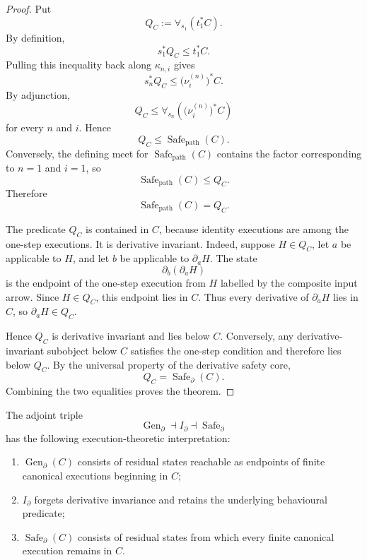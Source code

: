 \begin{proof}
Put
\[
    Q_C
    :=
    \forall_{s_1}(t_1^\ast C).
\]
By definition,
\[
    s_1^\ast Q_C
    \leq
    t_1^\ast C.
\]
Pulling this inequality back along \(\kappa_{n,i}\) gives
\[
    s_n^\ast Q_C
    \leq
    \bigl(\nu_i^{(n)}\bigr)^\ast C.
\]
By adjunction,
\[
    Q_C
    \leq
    \forall_{s_n}
    \left(
        \bigl(\nu_i^{(n)}\bigr)^\ast C
    \right)
\]
for every \(n\) and \(i\). Hence
\[
    Q_C
    \leq
    \operatorname{Safe}_{\mathrm{path}}(C).
\]
Conversely, the defining meet for
\(\operatorname{Safe}_{\mathrm{path}}(C)\) contains the factor corresponding
to \(n=1\) and \(i=1\), so
\[
    \operatorname{Safe}_{\mathrm{path}}(C)
    \leq
    Q_C.
\]
Therefore
\[
    \operatorname{Safe}_{\mathrm{path}}(C)=Q_C.
\]

The predicate \(Q_C\) is contained in \(C\), because identity executions are
among the one-step executions. It is derivative invariant. Indeed, suppose
\(H\in Q_C\), let \(a\) be applicable to \(H\), and let \(b\) be applicable
to \(\partial_aH\). The state
\[
    \partial_b(\partial_aH)
\]
is the endpoint of the one-step execution from \(H\) labelled by the
composite input arrow. Since \(H\in Q_C\), this endpoint lies in \(C\).
Thus every derivative of \(\partial_aH\) lies in \(C\), so
\(\partial_aH\in Q_C\).

Hence \(Q_C\) is derivative invariant and lies below \(C\). Conversely, any
derivative-invariant subobject below \(C\) satisfies the one-step condition
and therefore lies below \(Q_C\). By the universal property of the derivative
safety core,
\[
    Q_C=\operatorname{Safe}_{\partial}(C).
\]
Combining the two equalities proves the theorem.
\end{proof}

\begin{corollary}
\label{cor:temporal-meaning-derivative-adjoint-triple}
The adjoint triple
\[
    \operatorname{Gen}_{\partial}
    \dashv
    I_{\partial}
    \dashv
    \operatorname{Safe}_{\partial}
\]
has the following execution-theoretic interpretation:
\begin{enumerate}
    \item \(\operatorname{Gen}_{\partial}(C)\) consists of residual states
    reachable as endpoints of finite canonical executions beginning in \(C\);
    \item \(I_{\partial}\) forgets derivative invariance and retains the
    underlying behavioural predicate;
    \item \(\operatorname{Safe}_{\partial}(C)\) consists of residual states
    from which every finite canonical execution remains in \(C\).
\end{enumerate}
\end{corollary}



